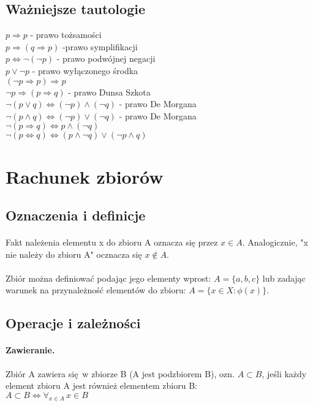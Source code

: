 \documentclass{article}
\begin{document}
    \subsection{Ważniejsze tautologie}
    $p \Longrightarrow p$ - prawo tożsamości \\
    $p \Longrightarrow (q \Longrightarrow p)$ -prawo symplifikacji \\
    $p \Leftrightarrow \neg(\neg p)$ - prawo podwójnej negacji \\
    $p \vee \neg p$ - prawo wyłączonego środka \\
    $(\neg p \Longrightarrow p) \Longrightarrow p$ \\
    $\neg p \Longrightarrow (p \Longrightarrow q)$ - prawo Dunsa Szkota \\
    $\neg (p \vee q) \Leftrightarrow (\neg p) \wedge (\neg q)$ - prawo De Morgana \\
    $\neg (p \wedge q) \Leftrightarrow (\neg p) \vee (\neg q)$ - prawo De Morgana \\
    $\neg(p \Longrightarrow q) \Leftrightarrow p \wedge (\neg q)$\\
    $\neg(p \Leftrightarrow q) \Leftrightarrow (p \wedge \neg q) \vee (\neg p \wedge q)$

    \newpage
    \section{Rachunek zbiorów}
    \subsection{Oznaczenia i definicje}
    \paragraph{} Fakt należenia elementu x do zbioru A oznacza się przez $x \in A$. Analogicznie, "x nie należy do zbioru A" ocznacza się $x \notin A$.
    \paragraph{} Zbiór można definiować podając jego elementy wprost: $A = \{a, b, c\}$ lub zadając warunek na przynależność elementów do zbioru: $A = \{x \in X: \phi (x)\}$. 
    \subsection{Operacje i zależności}
    \paragraph{Zawieranie.} Zbiór A zawiera się w zbiorze B (A jest podzbiorem B), ozn. $A \subset B$, jeśli każdy element zbioru A jest również elementem zbioru B:\\
    $A \subset B \Leftrightarrow \forall_{x\in A} \,  x\in B$ 
\end{document}
